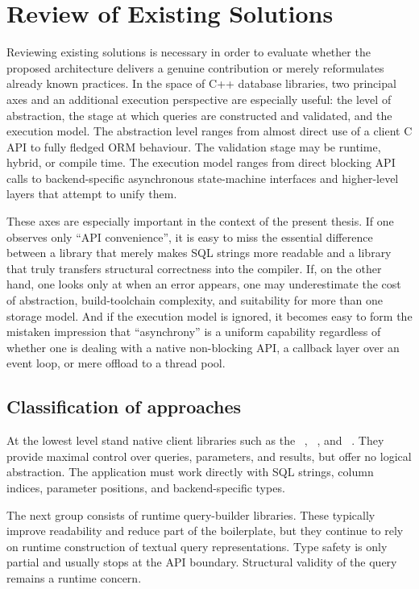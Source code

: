 \section{Review of Existing Solutions}
\label{sec:existing_solutions}

Reviewing existing solutions is necessary in order to evaluate whether the proposed architecture delivers a genuine contribution or merely reformulates already known practices. In the space of C++ database libraries, two principal axes and an additional execution perspective are especially useful: the level of abstraction, the stage at which queries are constructed and validated, and the execution model. The abstraction level ranges from almost direct use of a client C API to fully fledged ORM behaviour. The validation stage may be runtime, hybrid, or compile time. The execution model ranges from direct blocking API calls to backend-specific asynchronous state-machine interfaces and higher-level layers that attempt to unify them.

These axes are especially important in the context of the present thesis. If one observes only ``API convenience'', it is easy to miss the essential difference between a library that merely makes SQL strings more readable and a library that truly transfers structural correctness into the compiler. If, on the other hand, one looks only at when an error appears, one may underestimate the cost of abstraction, build-toolchain complexity, and suitability for more than one storage model. And if the execution model is ignored, it becomes easy to form the mistaken impression that ``asynchrony'' is a uniform capability regardless of whether one is dealing with a native non-blocking API, a callback layer over an event loop, or mere offload to a thread pool.

\subsection{Classification of approaches}

At the lowest level stand native client libraries such as the ~\cite{sqlite_api}, ~\cite{libpq}, and ~\cite{mysql_connector}. They provide maximal control over queries, parameters, and results, but offer no logical abstraction. The application must work directly with SQL strings, column indices, parameter positions, and backend-specific types.

The next group consists of runtime query-builder libraries. These typically improve readability and reduce part of the boilerplate, but they continue to rely on runtime construction of textual query representations. Type safety is only partial and usually stops at the API boundary. Structural validity of the query remains a runtime concern.

